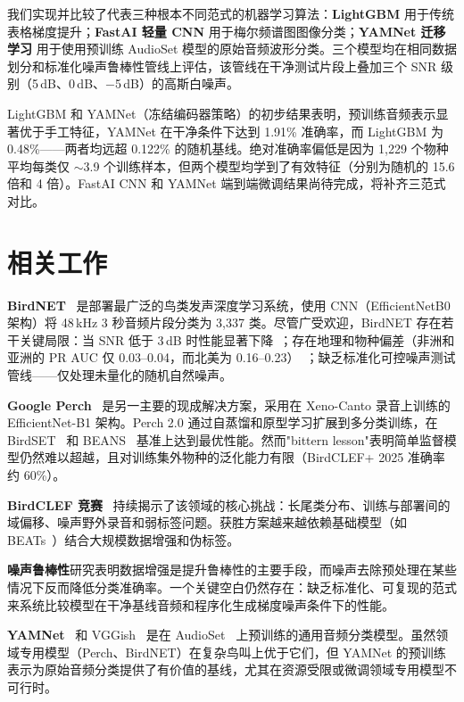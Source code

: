 \documentclass[conference]{IEEEtran}
\begin{document}
我们实现并比较了代表三种根本不同范式的机器学习算法：\textbf{LightGBM} 用于传统表格梯度提升；\textbf{FastAI 轻量 CNN} 用于梅尔频谱图图像分类；\textbf{YAMNet 迁移学习} 用于使用预训练 AudioSet 模型的原始音频波形分类。三个模型均在相同数据划分和标准化噪声鲁棒性管线上评估，该管线在干净测试片段上叠加三个 SNR 级别（5\,dB、0\,dB、$-$5\,dB）的高斯白噪声。

LightGBM 和 YAMNet（冻结编码器策略）的初步结果表明，预训练音频表示显著优于手工特征，YAMNet 在干净条件下达到 1.91\% 准确率，而 LightGBM 为 0.48\%——两者均远超 0.122\% 的随机基线。绝对准确率偏低是因为 1,229 个物种平均每类仅 $\sim$3.9 个训练样本，但两个模型均学到了有效特征（分别为随机的 15.6 倍和 4 倍）。FastAI CNN 和 YAMNet 端到端微调结果尚待完成，将补齐三范式对比。

\section{相关工作}
\textbf{BirdNET}~\cite{kahl2021birdnet} 是部署最广泛的鸟类发声深度学习系统，使用 CNN（EfficientNetB0 架构）将 48\,kHz 3 秒音频片段分类为 3,337 类。尽管广受欢迎，BirdNET 存在若干关键局限：当 SNR 低于 3\,dB 时性能显著下降~\cite{boreal_owl}；存在地理和物种偏差（非洲和亚洲的 PR AUC 仅 0.03--0.04，而北美为 0.16--0.23）~\cite{funosas2026global}；缺乏标准化可控噪声测试管线——仅处理未量化的随机自然噪声。

\textbf{Google Perch}~\cite{perch2025} 是另一主要的现成解决方案，采用在 Xeno-Canto 录音上训练的 EfficientNet-B1 架构。Perch 2.0 通过自蒸馏和原型学习扩展到多分类训练，在 BirdSET~\cite{rauch2024birdset} 和 BEANS~\cite{hagiwara2023beans} 基准上达到最优性能。然而"bittern lesson"表明简单监督模型仍然难以超越，且对训练集外物种的泛化能力有限（BirdCLEF+ 2025 准确率约 60\%）。

\textbf{BirdCLEF 竞赛}~\cite{birdclef2021_2026} 持续揭示了该领域的核心挑战：长尾类分布、训练与部署间的域偏移、噪声野外录音和弱标签问题。获胜方案越来越依赖基础模型（如 BEATs~\cite{chen2023beats}）结合大规模数据增强和伪标签。

\textbf{噪声鲁棒性}研究表明数据增强是提升鲁棒性的主要手段，而噪声去除预处理在某些情况下反而降低分类准确率。一个关键空白仍然存在：缺乏标准化、可复现的范式来系统比较模型在干净基线音频和程序化生成梯度噪声条件下的性能。

\textbf{YAMNet}~\cite{yamnet_tfhub} 和 VGGish~\cite{vggish} 是在 AudioSet~\cite{gemmeke2017audioset} 上预训练的通用音频分类模型。虽然领域专用模型（Perch、BirdNET）在复杂鸟叫上优于它们，但 YAMNet 的预训练表示为原始音频分类提供了有价值的基线，尤其在资源受限或微调领域专用模型不可行时。
\end{document}
